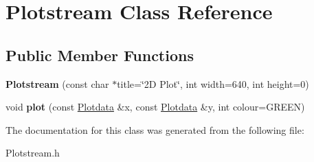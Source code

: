 \hypertarget{class_plotstream}{}\section{Plotstream Class Reference}
\label{class_plotstream}
\subsection*{Public Member Functions}
\begin{DoxyCompactItemize}
\item 
{\bfseries Plotstream} (const char $\ast$title=\char`\"{}2\+D Plot\char`\"{}, int width=640, int height=0)\hypertarget{class_plotstream_afb32ce4836f146724678f854332b7f6d}{}\label{class_plotstream_afb32ce4836f146724678f854332b7f6d}

\item 
void {\bfseries plot} (const \hyperlink{class_plotdata}{Plotdata} \&x, const \hyperlink{class_plotdata}{Plotdata} \&y, int colour=G\+R\+E\+EN)\hypertarget{class_plotstream_aa240f5b7b83a629e8821113111b8110e}{}\label{class_plotstream_aa240f5b7b83a629e8821113111b8110e}

\end{DoxyCompactItemize}


The documentation for this class was generated from the following file\+:\begin{DoxyCompactItemize}
\item 
Plotstream.\+h\end{DoxyCompactItemize}
